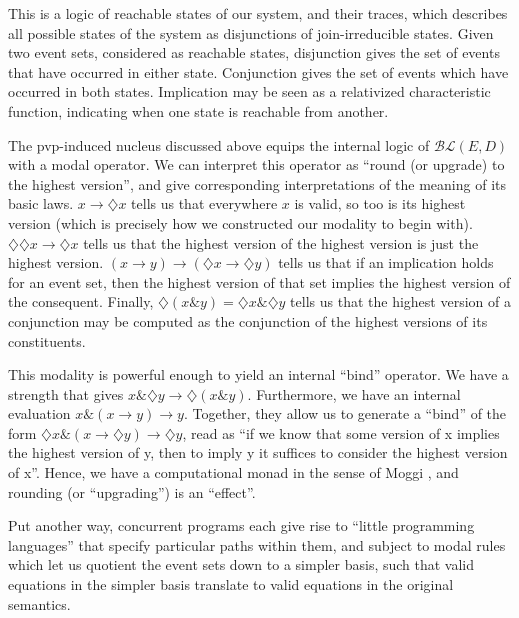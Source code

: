 \documentclass[a4paper,USenglish,cleveref, autoref, thm-restate,authorcolumns]{lipics-v2019}
\newcommand{\BLc}{\mathcal{BL}}
\newcommand{\band}{\mathop{\&}}
\newcommand{\Dia}{\diamondsuit}
\begin{document}
This is a logic of reachable states of our system, and their traces, which describes all possible states of the system as disjunctions of join-irreducible states. Given two event sets, considered as reachable states, disjunction gives the set of events that have occurred in either state. Conjunction gives the set of events which have occurred in both states. Implication may be seen as a relativized characteristic function, indicating when one state is reachable from another.

The pvp-induced nucleus discussed above equips the internal logic of \(\BLc(E,D)\) with a modal operator. We can interpret this operator as ``round (or upgrade) to the highest version'', and give corresponding interpretations of the meaning of its basic laws. \(x \rightarrow \Dia{x}\) tells us that everywhere \(x\) is valid, so too is its highest version (which is precisely how we constructed our modality to begin with). \(\Dia\Dia{x} \rightarrow \Dia{x}\) tells us that the highest version of the highest version is just the highest version. \((x \rightarrow y) \rightarrow (\Dia{x} \rightarrow \Dia{y})\)  tells us that if an implication holds for an event set, then the highest version of that set implies the highest version of the consequent. Finally, \(\Dia(x \band y) = \Dia{x} \band \Dia{y}\) tells us that the highest version of a conjunction may be computed as the conjunction of the highest versions of its constituents.

This modality is powerful enough to yield an internal ``bind'' operator. We have a strength that gives \(x \band \Dia{y} \rightarrow \Dia(x \band y)\). Furthermore, we have an internal evaluation \(x \band (x \rightarrow y) \rightarrow y\). Together, they allow us to generate a ``bind'' of the form \(\Dia{x} \band (x \rightarrow \Dia{y}) \rightarrow \Dia{y}\), read as ``if we know that some version of x implies the highest version of y, then to imply y it suffices to consider the highest version of x''. Hence, we have a computational monad in the sense of Moggi \cite{moggi1991notions}, and rounding (or ``upgrading'') is an ``effect''. 

Put another way, concurrent programs each give rise to ``little programming languages'' that specify particular paths within them, and subject to modal rules which let us quotient the event sets down to a simpler basis, such that valid equations in the simpler basis translate to valid equations in the original semantics. 
\end{document}

